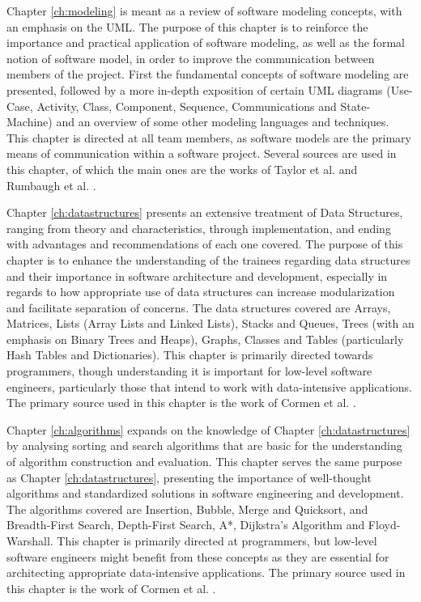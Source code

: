Chapter \ref{ch:modeling} is meant as a review of software modeling concepts, with an emphasis on the UML. The purpose of this chapter is to reinforce the importance and practical application of software modeling, as well as the formal notion of software model, in order to improve the communication between members of the project. First the fundamental concepts of software modeling are presented, followed by a more in-depth exposition of certain UML diagrams (Use-Case, Activity, Class, Component, Sequence, Communications and State-Machine) and an overview of some other modeling languages and techniques. This chapter is directed at all team members, as software models are the primary means of communication within a software project. Several sources are used in this chapter, of which the main ones are the works of Taylor et al. \cite{TAYLOR:2009} and Rumbaugh et al. \cite{RUMBAUGH:2004} \cite{BOOCH:2005}.

Chapter \ref{ch:datastructures} presents an extensive treatment of Data Structures, ranging from theory and characteristics, through implementation, and ending with advantages and recommendations of each one covered. The purpose of this chapter is to enhance the understanding of the trainees regarding data structures and their importance in software architecture and development, especially in regards to how appropriate use of data structures can increase modularization and facilitate separation of concerns. The data structures covered are Arrays, Matrices, Lists (Array Lists and Linked Lists), Stacks and Queues, Trees (with an emphasis on Binary Trees and Heaps), Graphs, Classes and Tables (particularly Hash Tables and Dictionaries). This chapter is primarily directed towards programmers, though understanding it is important for low-level software engineers, particularly those that intend to work with data-intensive applications. The primary source used in this chapter is the work of Cormen et al. \cite{CORMEN:2001}.

Chapter \ref{ch:algorithms} expands on the knowledge of Chapter \ref{ch:datastructures} by analysing sorting and search algorithms that are basic for the understanding of algorithm construction and evaluation. This chapter serves the same purpose as Chapter \ref{ch:datastructures}, presenting the importance of well-thought algorithms and standardized solutions in software engineering and development. The algorithms covered are Insertion, Bubble, Merge and Quicksort, and Breadth-First Search, Depth-First Search, A*, Dijkstra's Algorithm and Floyd-Warshall. This chapter is primarily directed at programmers, but low-level software engineers might benefit from these concepts as they are essential for architecting appropriate data-intensive applications. The primary source used in this chapter is the work of Cormen et al. \cite{CORMEN:2001}.

